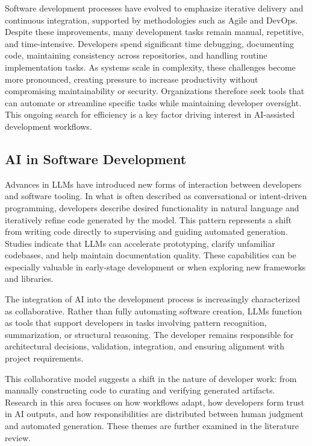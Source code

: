 Software development processes have evolved to emphasize iterative delivery and continuous integration, supported by methodologies such as Agile and DevOps. Despite these improvements, many development tasks remain manual, repetitive, and time-intensive. Developers spend significant time debugging, documenting code, maintaining consistency across repositories, and handling routine implementation tasks. As systems scale in complexity, these challenges become more pronounced, creating pressure to increase productivity without compromising maintainability or security. Organizations therefore seek tools that can automate or streamline specific tasks while maintaining developer oversight. This ongoing search for efficiency is a key factor driving interest in AI-assisted development workflows. \cite{Zhang:2025ea, Ahmed:2025ai, Jabrw:2025ss, Terragni:2025fa}

\subsection{AI in Software Development}

Advances in LLMs have introduced new forms of interaction between developers and software tooling. In what is often described as conversational or intent-driven programming, developers describe desired functionality in natural language and iteratively refine code generated by the model. This pattern represents a shift from writing code directly to supervising and guiding automated generation. Studies indicate that LLMs can accelerate prototyping, clarify unfamiliar codebases, and help maintain documentation quality. These capabilities can be especially valuable in early-stage development or when exploring new frameworks and libraries.

The integration of AI into the development process is increasingly characterized as collaborative. Rather than fully automating software creation, LLMs function as tools that support developers in tasks involving pattern recognition, summarization, or structural reasoning. The developer remains responsible for architectural decisions, validation, integration, and ensuring alignment with project requirements.

This collaborative model suggests a shift in the nature of developer work: from manually constructing code to curating and verifying generated artifacts. Research in this area focuses on how workflows adapt, how developers form trust in AI outputs, and how responsibilities are distributed between human judgment and automated generation. These themes are further examined in the literature review. \cite{Ahmed:2025ai, Zhang:2025ea, Durrani:2024ad, Jabrw:2025ss, Banh:2025cf, Farhanna:2025eu, KarlovsKarlovskis:2024ga, Terragni:2025fa}

